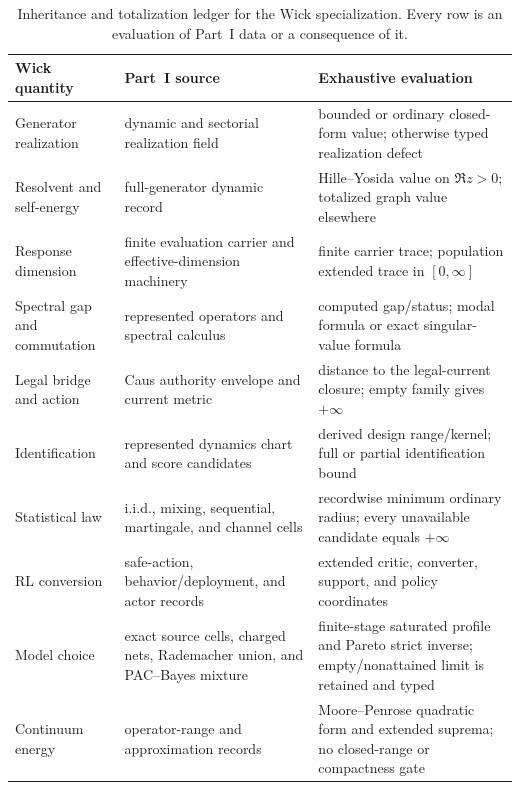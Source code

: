 \documentclass[11pt]{article}
\numberwithin{section}{part}
\theoremstyle{plain}
\theoremstyle{definition}
\theoremstyle{remark}
\begin{document}
\begin{table}[tbp]
\centering
\small
\begin{tabular}{@{}p{.23\linewidth}p{.31\linewidth}p{.36\linewidth}@{}}
\toprule
Wick quantity & Part~I source & Exhaustive evaluation\\
\midrule
Generator realization
& dynamic and sectorial realization field
& bounded or ordinary closed-form value; otherwise typed realization defect\\
Resolvent and self-energy
& full-generator dynamic record
& Hille--Yosida value on \(\Re z>0\); totalized graph value elsewhere\\
Response dimension
& finite evaluation carrier and effective-dimension machinery
& finite carrier trace; population extended trace in \([0,\infty]\)\\
Spectral gap and commutation
& represented operators and spectral calculus
& computed gap/status; modal formula or exact singular-value formula\\
Legal bridge and action
& Caus authority envelope and current metric
& distance to the legal-current closure; empty family gives \(+\infty\)\\
Identification
& represented dynamics chart and score candidates
& derived design range/kernel; full or partial identification bound\\
Statistical law
& i.i.d., mixing, sequential, martingale, and channel cells
& recordwise minimum ordinary radius; every unavailable candidate equals
  \(+\infty\)\\
RL conversion
& safe-action, behavior/deployment, and actor records
& extended critic, converter, support, and policy coordinates\\
Model choice
& exact source cells, charged nets, Rademacher union, and PAC--Bayes mixture
& finite-stage saturated profile and Pareto strict inverse; empty/nonattained
  limit is retained and typed\\
Continuum energy
& operator-range and approximation records
& Moore--Penrose quadratic form and extended suprema; no closed-range or
compactness gate\\
\bottomrule
\end{tabular}
\caption{Inheritance and totalization ledger for the Wick specialization.
Every row is an evaluation of Part~I data or a consequence of it.}
\label{tab:wick-inheritance-totalization}
\end{table}
\FloatBarrier
\end{document}
